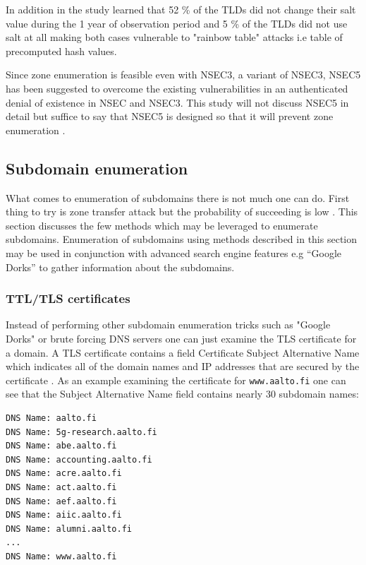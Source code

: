 In addition in the study \citet{NSEC3_hash_breaking} learned that 52 \% of the TLDs did not change their salt value during the 1 year of observation period and 5 \% of the TLDs did not use salt at all making both cases vulnerable to "rainbow table" attacks i.e table of precomputed hash values.

Since zone enumeration is feasible even with NSEC3, a variant of NSEC3, NSEC5 \cite{NSEC5} has been suggested to overcome the existing vulnerabilities in an authenticated denial of existence in NSEC and NSEC3. This study will not discuss NSEC5 in detail but suffice to say that NSEC5 is designed so that it will prevent zone enumeration \cite{NSEC5_provably}. 



\subsection{Subdomain enumeration}

What comes to enumeration of subdomains there is not much one can do. First thing to try is zone transfer attack but the probability of succeeding is low \cite{NSEC3_hash_breaking}. This section discusses the few methods which may be leveraged to enumerate subdomains. Enumeration of subdomains using methods described in this section may be used in conjunction with advanced search engine features e.g “Google Dorks” to gather information about the subdomains.


\subsubsection{TTL/TLS certificates}

Instead of performing other subdomain enumeration tricks such as "Google Dorks" or brute forcing DNS servers one can just examine the TLS certificate for a domain. A TLS certificate contains a field Certificate Subject Alternative Name which indicates all of the domain names and IP addresses that are secured by the certificate \citep{hacking_exposed}. As an example examining the certificate for \texttt{www.aalto.fi} one can see that the Subject Alternative Name field contains nearly 30 subdomain names:

\begin{verbatim}
DNS Name: aalto.fi
DNS Name: 5g-research.aalto.fi
DNS Name: abe.aalto.fi
DNS Name: accounting.aalto.fi
DNS Name: acre.aalto.fi
DNS Name: act.aalto.fi
DNS Name: aef.aalto.fi
DNS Name: aiic.aalto.fi
DNS Name: alumni.aalto.fi
...
DNS Name: www.aalto.fi
\end{verbatim}

